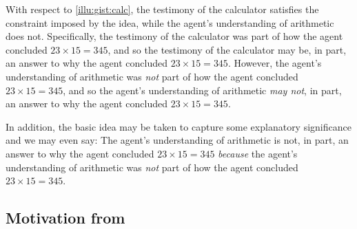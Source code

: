 \begin{note}
  With respect to \autoref{illu:gist:calc}, the testimony of the calculator satisfies the constraint imposed by the idea, while the agent's understanding of arithmetic does not.
  Specifically, the testimony of the calculator was part of how the agent concluded \(23 \times 15 = 345\), and so the testimony of the calculator may be, in part, an answer to why the agent concluded \(23 \times 15 = 345\).
  However, the agent's understanding of arithmetic was \emph{not} part of how the agent concluded \(23 \times 15 = 345\), and so the agent's understanding of arithmetic \emph{may not}, in part, an answer to why the agent concluded \(23 \times 15 = 345\).

  In addition, the basic idea may be taken to capture some explanatory significance and we may even say:
  The agent's understanding of arithmetic is not, in part, an answer to why the agent concluded \(23 \times 15 = 345\) \emph{because} the agent's understanding of arithmetic was \emph{not} part of how the agent concluded \(23 \times 15 = 345\).
\end{note}

\subsection{Motivation from \citeauthor{Davidson:1963aa}}


